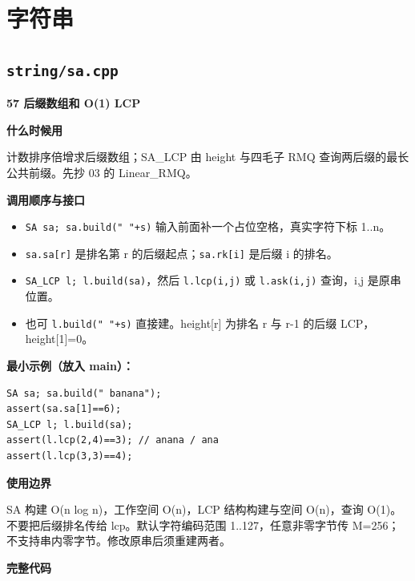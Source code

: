 \documentclass[UTF8,a4paper,10pt]{ctexart}
\newcommand{\TemplUsage}[1]{\textbf{什么时候用}\par #1\par}
\newcommand{\TemplApi}[1]{\textbf{调用顺序与接口}\par #1\par}
\newcommand{\TemplNote}[1]{\textbf{使用边界}\par #1\par}
\begin{document}
\section{字符串}
\subsection{\texttt{string/sa.cpp}}
\textbf{57 后缀数组和 O(1) LCP}

\TemplUsage{计数排序倍增求后缀数组；SA\_LCP 由 height 与四毛子 RMQ 查询两后缀的最长公共前缀。先抄 03 的 Linear\_RMQ。}
\TemplApi{\begin{itemize}
\item \texttt{SA sa; sa.build(" "+s)} 输入前面补一个占位空格，真实字符下标 1..n。
\item \texttt{sa.sa[r]} 是排名第 r 的后缀起点；\texttt{sa.rk[i]} 是后缀 i 的排名。
\item \texttt{SA\_LCP l; l.build(sa)}，然后 \texttt{l.lcp(i,j)} 或 \texttt{l.ask(i,j)} 查询，i,j 是原串位置。
\item 也可 \texttt{l.build(" "+s)} 直接建。height[r] 为排名 r 与 r-1 的后缀 LCP，height[1]=0。
\end{itemize}}
\textbf{最小示例（放入 main）：}
\begin{lstlisting}
SA sa; sa.build(" banana");
assert(sa.sa[1]==6);
SA_LCP l; l.build(sa);
assert(l.lcp(2,4)==3); // anana / ana
assert(l.lcp(3,3)==4);
\end{lstlisting}
\TemplNote{SA 构建 O(n log n)，工作空间 O(n)，LCP 结构构建与空间 O(n)，查询 O(1)。不要把后缀排名传给 lcp。默认字符编码范围 1..127，任意非零字节传 M=256；不支持串内零字节。修改原串后须重建两者。}
\textbf{完整代码}
\end{document}
